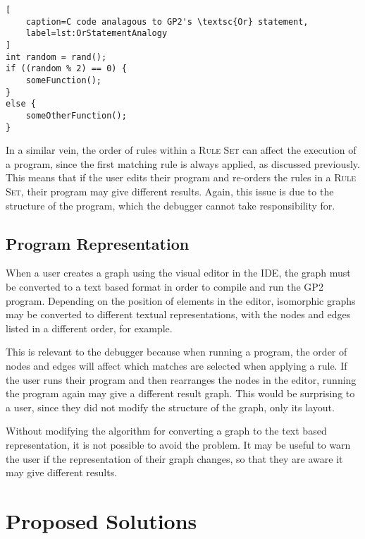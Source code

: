 \documentclass[authoryearcitations]{UoYCSproject}
\begin{document}
\begin{lstlisting}[
    caption=C code analagous to GP2's \textsc{Or} statement,
    label=lst:OrStatementAnalogy
]
int random = rand();
if ((random % 2) == 0) {
    someFunction();
}
else {
    someOtherFunction();
}
\end{lstlisting}

In a similar vein, the order of rules within a \textsc{Rule Set} can affect the
execution of a program, since the first matching rule is always applied, as
discussed previously. This means that if the user edits their program and
re-orders the rules in a \textsc{Rule Set}, their program may give different
results. Again, this issue is due to the structure of the program, which the
debugger cannot take responsibility for.


\subsection{Program Representation}
\label{sec:ProgramRepresentation}

When a user creates a graph using the visual editor in the IDE, the graph must
be converted to a text based format in order to compile and run the GP2 program.
Depending on the position of elements in the editor, isomorphic graphs may be
converted to different textual representations, with the nodes and edges listed
in a different order, for example.

This is relevant to the debugger because when running a program, the order of
nodes and edges will affect which matches are selected when applying a rule. If
the user runs their program and then rearranges the nodes in the editor, running
the program again may give a different result graph. This would be surprising to
a user, since they did not modify the structure of the graph, only its layout.

Without modifying the algorithm for converting a graph to the text based
representation, it is not possible to avoid the problem. It may be
useful to warn the user if the representation of their graph changes, so that
they are aware it may give different results.


\section{Proposed Solutions}
\label{sec:ProposedSolutions}
\end{document}
